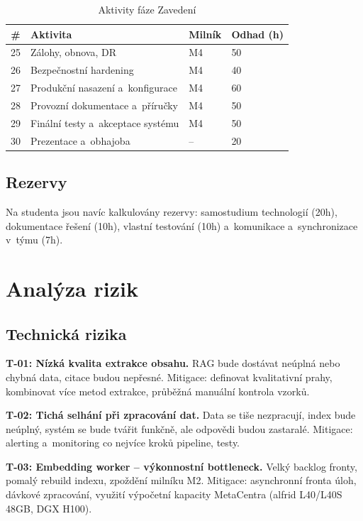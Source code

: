 \documentclass[a4paper, 11pt]{article}
\begin{document}
\begin{table}[H]
\centering\small
\begin{tabularx}{\textwidth}{c X l l}
\toprule
\textbf{\#} & \textbf{Aktivita} & \textbf{Milník} & \textbf{Odhad (h)} \\
\midrule
25 & Zálohy, obnova, DR & M4 & 50 \\
26 & Bezpečnostní hardening & M4 & 40 \\
27 & Produkční nasazení a~konfigurace & M4 & 60 \\
28 & Provozní dokumentace a~příručky & M4 & 50 \\
29 & Finální testy a~akceptace systému & M4 & 50 \\
30 & Prezentace a~obhajoba & -- & 20 \\
\bottomrule
\end{tabularx}
\caption{Aktivity fáze Zavedení}
\label{tab:plan-zavedeni}
\end{table}

\subsection{Rezervy}

Na studenta jsou navíc kalkulovány rezervy: samostudium technologií (20h), dokumentace řešení (10h), vlastní testování (10h) a~komunikace a~synchronizace v~týmu (7h).

\newpage
\section{Analýza rizik}

\subsection{Technická rizika}

\textbf{T-01: Nízká kvalita extrakce obsahu.} RAG bude dostávat neúplná nebo chybná data, citace budou nepřesné. Mitigace: definovat kvalitativní prahy, kombinovat více metod extrakce, průběžná manuální kontrola vzorků.

\textbf{T-02: Tichá selhání při zpracování dat.} Data se tiše nezpracují, index bude neúplný, systém se bude tvářit funkčně, ale odpovědi budou zastaralé. Mitigace: alerting a~monitoring co nejvíce kroků pipeline, testy.

\textbf{T-03: Embedding worker -- výkonnostní bottleneck.} Velký backlog fronty, pomalý rebuild indexu, zpoždění milníku M2. Mitigace: asynchronní fronta úloh, dávkové zpracování, využití výpočetní kapacity MetaCentra (alfrid L40/L40S 48GB, DGX H100).
\end{document}
